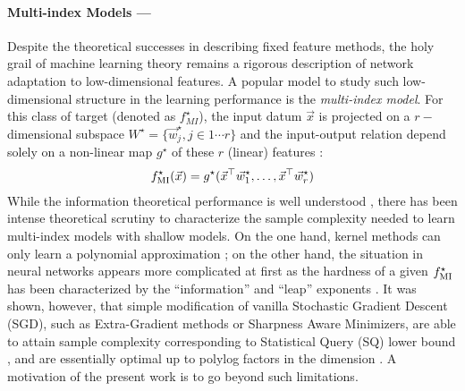 \paragraph{Multi-index Models ---}
Despite the theoretical successes in describing fixed feature methods, the holy grail of machine learning theory remains a rigorous description of network adaptation to low-dimensional features. A popular model to study such low-dimensional structure in the learning performance is the  {\it multi-index model}. For this class of target (denoted as $f^\star_{MI}$), the input datum $\vec x$ is projected on a $r-$dimensional subspace $W^\star = \{\vec{w}^\star_j, j \in 1 \cdots r\}$ and the input-output relation depend solely on a non-linear map $g^\star$ of these $r$ (linear) features : 
\begin{align}
    f^\star_{\rm MI}(\vec x) = g^\star(\vec{x}^\top \vec{w}^\star_1, \dots,\vec{x}^\top \vec{w}^\star_r)
\end{align}
While the information theoretical performance is well understood \cite{barbier2019optimal,aubin2018committee}, there has been intense theoretical scrutiny to characterize the sample complexity needed to learn multi-index models with shallow models. On the one hand, kernel methods can only learn a polynomial approximation \citep{mei2022generalization}; on the other hand, the situation in neural networks appears more complicated at first as the hardness of a given $f^\star_{\rm MI}$ has been characterized by the ``information'' and ``leap'' exponents \cite{BenArous2021, abbe2022merged, dandi2024twolayer, damian2024computational, dandi2024benefits,arnaboldi2024repetita, lee2024neural, bietti2023learning, simsek2024learning, arous2024stochastic}.
It was shown, however, that simple modification of vanilla Stochastic Gradient Descent (SGD), such as Extra-Gradient methods or Sharpness Aware Minimizers, are able to attain sample complexity corresponding to Statistical Query (SQ) lower bound \citep{arnaboldi2024repetita, lee2024neural}, and are essentially optimal up to polylog factors in the dimension \citep{damian2024computational,troiani2024fundamental}. A motivation of the present work is to go beyond such limitations.
%